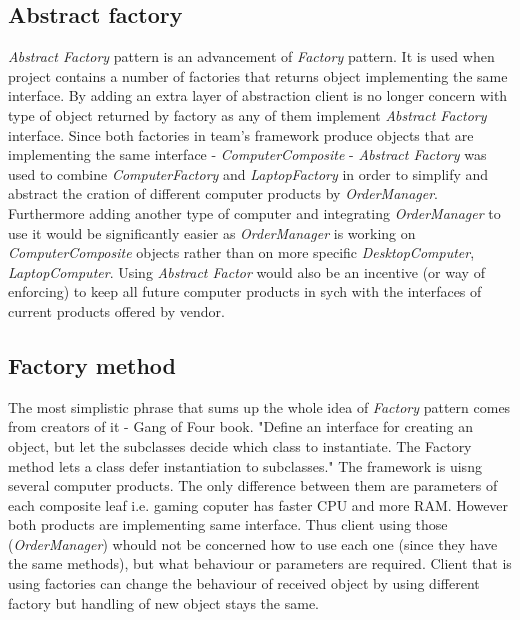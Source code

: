\documentclass[pdftex,11pt,a4paper]{article}
\begin{document}
\subsection{Abstract factory}
\emph{Abstract Factory} pattern is an advancement of \emph{Factory} pattern. It is used when project contains a number of factories that returns object implementing the same interface. By adding an extra layer of abstraction client is no longer concern with type of object returned by factory as any of them implement \emph{Abstract Factory} interface.
Since both factories in team's framework produce objects that are implementing the same interface - \emph{ComputerComposite} - \emph{Abstract Factory} was used to combine \emph{ComputerFactory} and \emph{LaptopFactory} in order to simplify and abstract the cration of different computer products by \emph{OrderManager}. Furthermore adding another type of computer and integrating \emph{OrderManager} to use it would be significantly easier as \emph{OrderManager} is working on \emph{ComputerComposite} objects rather than on more specific \emph{DesktopComputer}, \emph{LaptopComputer}. 
Using \emph{Abstract Factor} would also be an incentive (or way of enforcing) to keep all future computer products in sych with the interfaces of current products offered by vendor.

\subsection{Factory method}
The most simplistic phrase that sums up the whole idea of \emph{Factory} pattern comes from creators of it - Gang of Four book.
"Define an interface for creating an object, but let the subclasses decide which class to instantiate. The Factory method lets a class defer instantiation to subclasses."\cite{GOF_wika}
The framework is uisng several computer products. The only difference between them are parameters of each composite leaf i.e. gaming coputer has faster CPU and more RAM. However both products are implementing same interface. Thus client using those (\emph{OrderManager}) whould not be concerned how to use each one (since they have the same methods), but what behaviour or parameters are required. 
Client that is using factories can change the behaviour of received object by using different factory but handling of new object stays the same.
\end{document}
